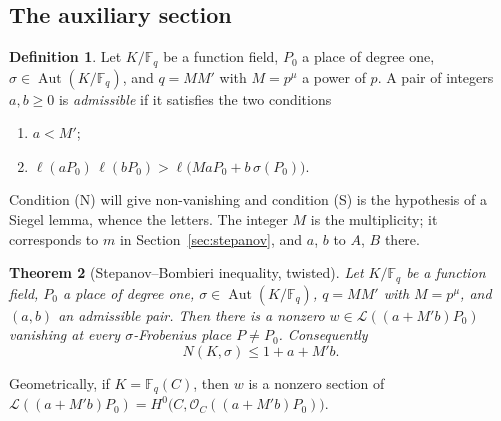 \documentclass[11pt]{amsbook}
\theoremstyle{plain}
\newtheorem{theorem}{Theorem}[section]
\theoremstyle{definition}
\newtheorem{definition}[theorem]{Definition}
\theoremstyle{remark}
\numberwithin{equation}{section}
\numberwithin{figure}{chapter}
\numberwithin{table}{chapter}
\newcommand{\F}{\mathbb{F}}
\DeclareMathOperator{\Aut}{Aut}
\newcommand{\calL}{\mathcal{L}}
\newcommand{\calO}{\mathcal{O}}
\begin{document}
\subsection{The auxiliary section}

\begin{definition}\label{def:ff-admissible}
Let $K/\F_q$ be a function field, $P_0$ a place of degree one,
$\sigma\in\Aut(K/\F_q)$, and $q=MM'$ with $M=p^\mu$ a power of $p$.
A pair of integers $a,b\ge0$ is \emph{admissible} if it satisfies
the two conditions
\begin{enumerate}[label=(\Alph*)]
\item[(N)] $a<M'$;
\item[(S)] $\ell(aP_0)\,\ell(bP_0)
>\ell\bigl(MaP_0+b\,\sigma(P_0)\bigr)$.
\end{enumerate}
\end{definition}

Condition (N) will give non-vanishing and condition (S) is the
hypothesis of a Siegel lemma, whence the letters. The integer $M$ is
the multiplicity; it corresponds to $m$ in
Section~\ref{sec:stepanov}, and $a$, $b$ to $A$, $B$ there.

\begin{theorem}[Stepanov--Bombieri inequality, twisted]
\label{thm:aux-section}
Let $K/\F_q$ be a function field, $P_0$ a place of degree one,
$\sigma\in\Aut(K/\F_q)$, $q=MM'$ with $M=p^\mu$, and $(a,b)$ an
admissible pair. Then there is a nonzero
$w\in\calL((a+M'b)P_0)$ vanishing at every $\sigma$-Frobenius place
$P\ne P_0$. Consequently
\begin{equation}\label{eq:sb-bound}
N(K,\sigma)\le1+a+M'b.
\end{equation}
\end{theorem}

Geometrically, if $K=\F_q(C)$, then $w$ is a nonzero section of
$\calL((a+M'b)P_0)=H^0\bigl(C,\calO_C((a+M'b)P_0)\bigr)$.
\end{document}

